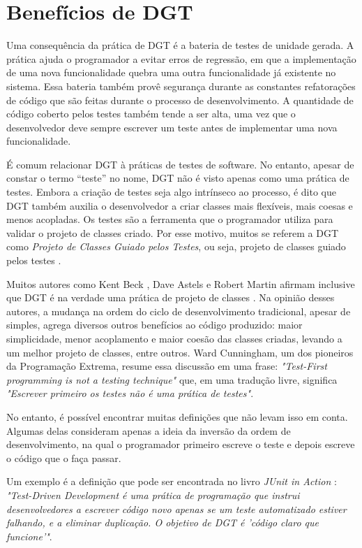 \section{Benefícios de DGT}

Uma consequência da prática de DGT é a bateria de testes de unidade gerada.
A prática ajuda o programador a evitar erros de regressão, em que a implementação de
uma nova funcionalidade quebra uma outra funcionalidade já existente no sistema.
Essa bateria também provê segurança durante as
constantes refatorações de código que são feitas durante o processo de
desenvolvimento.
A quantidade de código coberto pelos testes também tende a ser alta, uma vez que o
desenvolvedor deve sempre escrever um teste antes de implementar uma nova
funcionalidade. 

É comum relacionar DGT à práticas de testes de software. No entanto, apesar de constar o
termo ``teste'' no nome, DGT não é visto apenas como uma prática de testes.
Embora a criação de testes seja algo intrínseco ao processo, é dito que DGT também 
auxilia o desenvolvedor a criar classes mais flexíveis, mais coesas e
menos acopladas. Os testes são a ferramenta que o programador utiliza para
validar o projeto de classes criado. Por esse motivo, muitos se referem a DGT como
\textit{Projeto de Classes Guiado pelos Testes}, ou seja, projeto de classes guiado pelos testes
\cite{tdd-taxonomy}.

Muitos autores como Kent Beck \cite{aim-fire}, Dave Astels \cite{astels-tdd} e
Robert Martin \cite{bob-martin} afirmam inclusive que DGT é na verdade uma prática de
projeto de classes \cite{tdd-taxonomy} \cite{aim-fire}.
Na opinião desses autores, a mudança na ordem do ciclo de
desenvolvimento tradicional, apesar de simples, agrega diversos outros
benefícios ao código produzido: maior simplicidade, menor acoplamento e maior
coesão das classes criadas, levando a um melhor projeto de classes, entre
outros. Ward Cunningham, um dos pioneiros da Programação Extrema, resume essa 
discussão em uma frase: \textit{"Test-First programming is not a testing technique"} 
que, em uma tradução livre, significa \textit{"Escrever primeiro os testes
não é uma prática de testes"}.

No entanto, é possível encontrar muitas definições que
não levam isso em conta. Algumas delas consideram apenas a ideia da
inversão da ordem de desenvolvimento, na qual o programador primeiro
escreve o teste e depois escreve o código que o faça passar.

Um exemplo é a definição que pode ser encontrada no livro \textit{JUnit
in Action} \cite{junit-in-action}: \textit{"Test-Driven Development é uma
prática de programação que instrui desenvolvedores a escrever código novo
apenas se um teste automatizado estiver falhando, e a eliminar duplicação. O
objetivo de DGT é 'código claro que funcione'"}.

